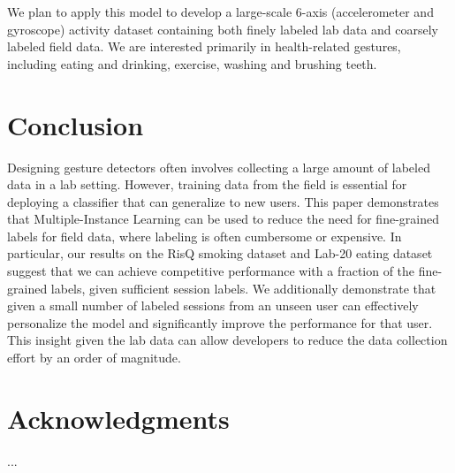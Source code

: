 \documentclass{sigchi}
\begin{document}
We plan to apply this model to develop a large-scale 6-axis (accelerometer and gyroscope) activity dataset containing both finely labeled lab data and coarsely labeled field data. We are interested primarily in health-related gestures, including eating and drinking, exercise, washing and brushing teeth.

\section{Conclusion}

Designing gesture detectors often involves collecting a large amount of labeled data in a lab setting. However, training data from the field is essential for deploying a classifier that can generalize to new users. This paper demonstrates that Multiple-Instance Learning can be used to reduce the need for fine-grained labels for field data, where labeling is often cumbersome or expensive. In particular, our results on the RisQ smoking dataset and Lab-20 eating dataset suggest that we can achieve competitive performance with a fraction of the fine-grained labels, given sufficient session labels. We additionally demonstrate that given a small number of labeled sessions from an unseen user can effectively personalize the model and significantly improve the performance for that user. This insight given the lab data can allow developers to reduce the data collection effort by an order of magnitude.

\section{Acknowledgments}

...

%
%
%
%
%
\balance{}

\balance{}



\end{document}

